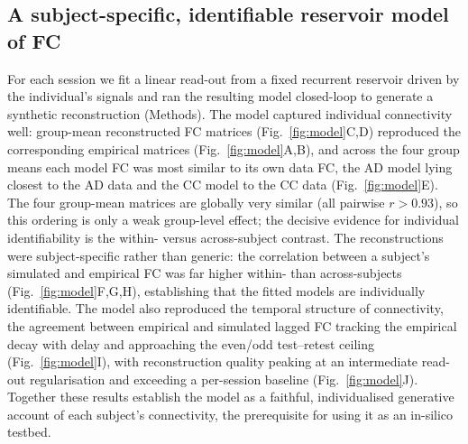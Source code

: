 \documentclass[11pt]{article}
\begin{document}
\subsection*{A subject-specific, identifiable reservoir model of FC}
For each session we fit a linear read-out from a fixed recurrent reservoir
driven by the individual's signals and ran the resulting model closed-loop to
generate a synthetic reconstruction (Methods). The model captured
individual connectivity well: group-mean reconstructed FC matrices
(Fig.~\ref{fig:model}C,D) reproduced the corresponding empirical matrices
(Fig.~\ref{fig:model}A,B), and across the four group means each model FC was
most similar to its own data FC, the AD model lying closest to the AD data and
the CC model to the CC data (Fig.~\ref{fig:model}E). The four group-mean matrices
are globally very similar (all pairwise $r>0.93$), so this ordering is only a weak
group-level effect; the decisive evidence for individual identifiability is the
within- versus across-subject contrast. The reconstructions were subject-specific rather than generic: the correlation between a subject's
simulated and empirical FC was far higher within- than across-subjects
(Fig.~\ref{fig:model}F,G,H), establishing that the fitted models are
individually identifiable. The model also reproduced the temporal structure of
connectivity, the agreement between empirical and simulated lagged FC tracking
the empirical decay with delay and approaching the even/odd test--retest
ceiling (Fig.~\ref{fig:model}I), with reconstruction quality peaking at an
intermediate read-out regularisation and exceeding a per-session baseline
(Fig.~\ref{fig:model}J). Together these results establish the model as a
faithful, individualised generative account of each subject's
connectivity, the prerequisite for using it as an in-silico testbed.
\end{document}
